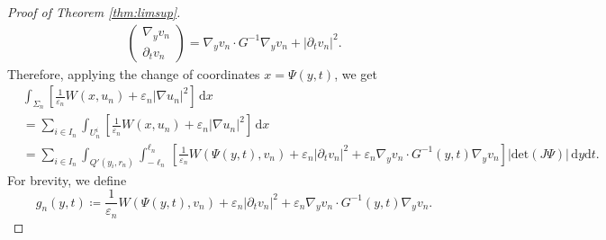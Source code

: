 \documentclass[a4paper, 11pt, reqno]{amsart}
\theoremstyle{plain}
\theoremstyle{definition}
\theoremstyle{remark}
\newcommand{\dd}{\,\mathrm{d}}
\begin{document}
\begin{proof}[Proof of Theorem \ref{thm:limsup}]
\begin{gather}
\begin{pmatrix}
        \nabla_y v_n \\ 
        \partial_t v_n
    \end{pmatrix} = \nabla_y v_n \cdot G^{-1} \nabla_y v_n + | \partial_t v_n |^2.
\end{gather}
Therefore, applying the change of coordinates $x = \Psi(y,t)$, we get
\begin{align*}
    &\int_{\Sigma_n} \left[ \frac{1}{\varepsilon_n} W(x, u_n) + \varepsilon_n | \nabla u_n|^2 \right] \dd x \\
    &= \sum_{i \in I_n} \int_{U_n^i} \left[ \frac{1}{\varepsilon_n} W(x, u_n) + \varepsilon_n | \nabla u_n|^2 \right] \dd x \\
    &= \sum_{i \in I_n} \int_{Q'(y_i, r_n)} \int_{-\ell_n}^{\ell_n} \left[ \frac{1}{\varepsilon_n} W(\Psi(y,t), v_n) + \varepsilon_n | \partial_t v_n|^2 + \varepsilon_n \nabla_y v_n \cdot G^{-1} (y,t) \nabla_y v_n \right] |\mathrm{det}(J\Psi)| \, \mathrm{d} y \mathrm{d} t.
\end{align*}
For brevity, we define
\begin{equation*}
    g_n (y,t) \coloneqq \frac{1}{\varepsilon_n} W(\Psi(y,t), v_n) + \varepsilon_n | \partial_t v_n|^2 + \varepsilon_n \nabla_y v_n \cdot G^{-1} (y,t) \nabla_y v_n.
\end{equation*}


\end{proof}
\end{document}
